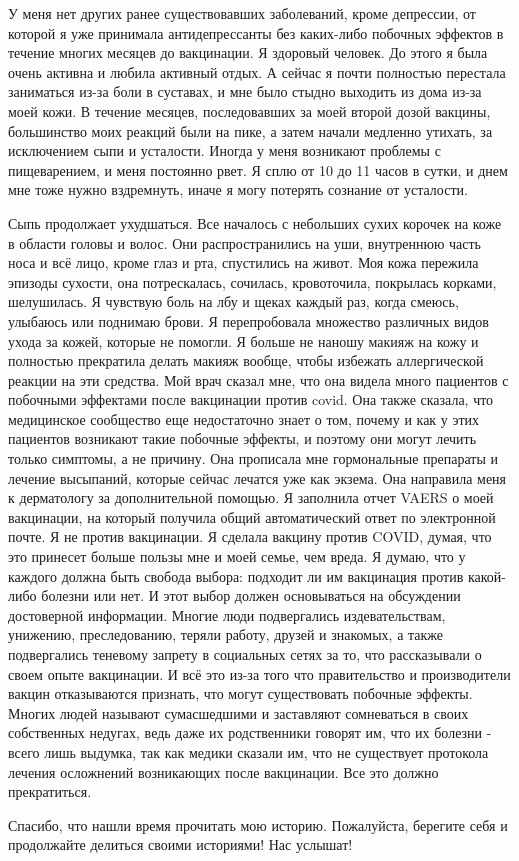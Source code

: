 {У меня нет других ранее существовавших заболеваний, кроме депрессии, от которой
я уже принимала антидепрессанты без каких-либо побочных эффектов в течение
многих месяцев до вакцинации. Я здоровый человек. До этого я была очень активна
и любила активный отдых. А сейчас я почти полностью перестала заниматься из-за
боли в суставах, и мне было стыдно выходить из дома из-за моей кожи. В течение
месяцев, последовавших за моей второй дозой вакцины, большинство моих реакций
были на пике, а затем начали медленно утихать, за исключением сыпи и
усталости. Иногда у меня возникают проблемы с пищеварением, и меня постоянно
рвет. Я сплю от 10 до 11 часов в сутки, и днем мне тоже нужно вздремнуть, иначе
я могу потерять сознание от усталости.

Сыпь продолжает ухудшаться. Все началось с небольших сухих корочек на коже в
области головы и волос. Они распространились на уши, внутреннюю часть носа и всё
лицо, кроме глаз и рта, спустились на живот. Моя кожа пережила эпизоды сухости,
она потрескалась, сочилась, кровоточила, покрылась корками, шелушилась. Я
чувствую боль на лбу и щеках каждый раз, когда смеюсь, улыбаюсь или поднимаю
брови. Я перепробовала множество различных видов ухода за кожей, которые не
помогли. Я больше не наношу макияж на кожу и полностью прекратила делать макияж
вообще, чтобы избежать аллергической реакции на эти средства. Мой врач сказал
мне, что она видела много пациентов с побочными эффектами после вакцинации
против covid. Она также сказала, что медицинское сообщество еще недостаточно
знает о том, почему и как у этих пациентов возникают такие побочные эффекты, и
поэтому они могут лечить только симптомы, а не причину. Она прописала мне
гормональные препараты и лечение высыпаний, которые сейчас лечатся уже как
экзема. Она направила меня к дерматологу за дополнительной помощью. Я заполнила
отчет VAERS о моей вакцинации, на который получила общий автоматический ответ по
электронной почте. Я не против вакцинации. Я сделала вакцину против COVID,
думая, что это принесет больше пользы мне и моей семье, чем вреда. Я думаю, что
у каждого должна быть свобода выбора: подходит ли им вакцинация против
какой-либо болезни или нет. И этот выбор должен основываться на обсуждении
достоверной информации. Многие люди подвергались издевательствам, унижению,
преследованию, теряли работу, друзей и знакомых, а также подвергались теневому
запрету в социальных сетях за то, что рассказывали о своем опыте вакцинации. И
всё это из-за того что правительство и производители вакцин отказываются
признать, что могут существовать побочные эффекты. Многих людей называют
сумасшедшими и заставляют сомневаться в своих собственных недугах, ведь даже их
родственники говорят им, что их болезни - всего лишь выдумка, так как медики
сказали им, что не существует протокола лечения осложнений возникающих после
вакцинации. Все это должно прекратиться.

Спасибо, что нашли время прочитать мою историю. Пожалуйста, берегите себя и
продолжайте делиться своими историями! Нас услышат!

}
